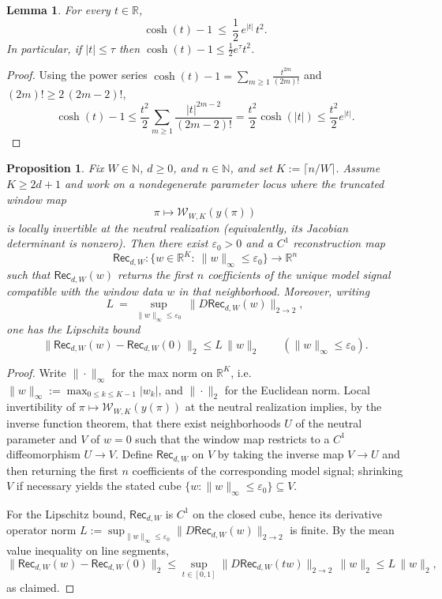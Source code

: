 \documentclass[11pt,reqno]{amsart}
\newtheorem{proposition}[theorem]{Proposition}
\newtheorem{lemma}[theorem]{Lemma}
\theoremstyle{definition}
\theoremstyle{remark}
\newcommand{\R}{\mathbb{R}}
\newcommand{\1}{\mathbf{1}}
\providecommand{\N}{\mathbb{N}}
\begin{document}
\begin{lemma}\label{lem:cosh-upper}
For every $t\in\R$,
\[
\cosh(t)-1 \ \le\ \frac12\,e^{|t|}\,t^2.
\]
In particular, if $|t|\le \tau$ then $\cosh(t)-1\le \frac12 e^{\tau}t^2$.
\end{lemma}

\begin{proof}
Using the power series $\cosh(t)-1=\sum_{m\ge 1}\frac{t^{2m}}{(2m)!}$ and $(2m)!\ge 2\,(2m-2)!$,
\[
\cosh(t)-1 \le \frac{t^2}{2}\sum_{m\ge 1}\frac{|t|^{2m-2}}{(2m-2)!}
= \frac{t^2}{2}\cosh(|t|)\le \frac{t^2}{2}e^{|t|}.
\]
\end{proof}


\begin{proposition}\label{prop:rec-exists}
Fix $W\in\N$, $d\ge 0$, and $n\in\N$, and set $K:=\lceil n/W\rceil$.
Assume $K\ge 2d+1$ and work on a nondegenerate parameter locus where the truncated window map
\[
\pi\longmapsto \mathcal{W}_{W,K}(y(\pi))
\]
is locally invertible at the neutral realization (equivalently, its Jacobian determinant is nonzero).
Then there exist $\varepsilon_0>0$ and a $C^1$ reconstruction map
\[
\mathsf{Rec}_{d,W}:\{w\in\R^K:\ \|w\|_\infty\le \varepsilon_0\}\to\R^n
\]
such that $\mathsf{Rec}_{d,W}(w)$ returns the first $n$ coefficients of the unique model signal
compatible with the window data $w$ in that neighborhood. Moreover, writing
\[
L\:=\ \sup_{\|w\|_\infty\le \varepsilon_0}\ \bigl\|D\mathsf{Rec}_{d,W}(w)\bigr\|_{2\to 2},
\]
one has the Lipschitz bound
\[
\|\mathsf{Rec}_{d,W}(w)-\mathsf{Rec}_{d,W}(0)\|_2\le L\,\|w\|_2\qquad(\|w\|_\infty\le \varepsilon_0).
\]
\end{proposition}

\begin{proof}
Write $\|\cdot\|_\infty$ for the max norm on $\R^K$, i.e.\ $\|w\|_\infty:=\max_{0\le k\le K-1}|w_k|$, and $\|\cdot\|_2$ for the Euclidean norm.
Local invertibility of $\pi\mapsto \mathcal{W}_{W,K}(y(\pi))$ at the neutral realization implies, by the inverse function theorem, that there exist
neighborhoods $U$ of the neutral parameter and $V$ of $w=0$ such that the window map restricts to a $C^1$ diffeomorphism $U\to V$.
Define $\mathsf{Rec}_{d,W}$ on $V$ by taking the inverse map $V\to U$ and then returning the first $n$ coefficients of the corresponding model signal;
shrinking $V$ if necessary yields the stated cube $\{w:\|w\|_\infty\le \varepsilon_0\}\subseteq V$.

For the Lipschitz bound, $\mathsf{Rec}_{d,W}$ is $C^1$ on the closed cube, hence its derivative operator norm
$L:=\sup_{\|w\|_\infty\le \varepsilon_0}\|D\mathsf{Rec}_{d,W}(w)\|_{2\to 2}$ is finite.
By the mean value inequality on line segments,
\[
\|\mathsf{Rec}_{d,W}(w)-\mathsf{Rec}_{d,W}(0)\|_2
\le \sup_{t\in[0,1]}\|D\mathsf{Rec}_{d,W}(tw)\|_{2\to 2}\,\|w\|_2
\le L\,\|w\|_2,
\]
as claimed.
\end{proof}
\end{document}
